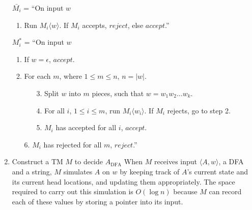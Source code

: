 \documentclass[11pt]{article}
\begin{document}
\begin{enumerate}[8.1]
    $\bar{M_i}$ = ``On input $w$
    \begin{enumerate}[label=\arabic*.]
      \item Run $M_i\langle w \rangle$. If $M_i$ accepts, $reject$, else $accept$.'' \\
    \end{enumerate}
    $M_i^*$ = ``On input $w$
    \begin{enumerate}[label=\arabic*.]
      \item If $w = \epsilon$, $accept$.
      \item For each $m$, where $1 \leq m \leq n$, $n = |w|$.
      \begin{enumerate}[label=\arabic*.]
        \item[3.] Split $w$ into $m$ pieces, such that $w = w_1w_2 \hdots w_k$.
        \item[4.] For all $i$, $1 \leq i \leq m$, run $M_i\langle w_i \rangle$. If $M_i$ rejects, go to step 2.
        \item[5.] $M_i$ has accepted for all $i$, $accept$.
      \end{enumerate}
      \item[6.] $M_i$ has rejected for all $m$, $reject$.'' \\
    \end{enumerate}
    \item Construct a TM $M$ to decide $A_\text{DFA}$ When $M$ receives input $\langle A, w \rangle$, a DFA and a string, $M$ simulates $A$ on $w$ by keeping track of $A$'s current state and its current head locations, and updating them appropriately. The space required to carry out this simulation is $O(\log{n})$ because $M$ can record each of these values by storing a pointer into its input.
\end{enumerate}
\end{document}
